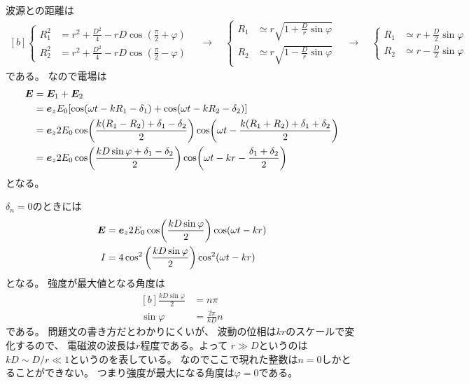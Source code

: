 \documentclass[../../sp_2017.tex]{subfiles}
\begin{document}
\subsection{}
波源との距離は
\begin{equation}\begin{aligned}[b]
    \begin{cases}
        R_1^2 &= r^2 +\frac{D^2}{4}-rD\cos(\frac{\pi}{2}+\varphi)\\
        R_2^2 &= r^2 +\frac{D^2}{4}-rD\cos(\frac{\pi}{2}-\varphi)
    \end{cases} \quad\to\quad
    \begin{cases}
        R_1 &\simeq r \sqrt{1+\frac{D}{r}\sin\varphi}\\
        R_2 &\simeq r \sqrt{1-\frac{D}{r}\sin\varphi}
    \end{cases}\quad\to\quad
    \begin{cases}
        R_1 &\simeq r + \frac{D}{2}\sin\varphi\\
        R_2 &\simeq r - \frac{D}{2}\sin\varphi
    \end{cases}
\end{aligned}\end{equation}
である。
なので電場は
\begin{equation}\begin{aligned}[b]
    \vb*{E} &= \vb*{E}_1+\vb*{E}_2\\
    &= \vb*{e}_zE_0\qty[\cos(\omega t-kR_1-\delta_1)+\cos(\omega t-kR_2-\delta_2)]\\
    &= \vb*{e}_z 2E_0\cos(\frac{k(R_1-R_2)+\delta_1-\delta_2}{2})\cos(\omega t-\frac{k(R_1+R_2)+\delta_1+\delta_2}{2})\\
    &= \vb*{e}_z 2E_0\cos(\frac{kD\sin\varphi+\delta_1-\delta_2}{2})\cos(\omega t-kr-\frac{\delta_1+\delta_2}{2})\\
\end{aligned}\end{equation}
となる。

\(\delta_n=0\)のときには
\begin{equation}\begin{aligned}[b]
    \vb*{E} &=  \vb*{e}_z 2E_0\cos(\frac{kD\sin\varphi}{2})\cos(\omega t-kr)\\
    I &= 4\cos^2\qty(\frac{kD\sin\varphi}{2})\cos^2(\omega t-kr)
\end{aligned}\end{equation}
となる。
強度が最大値となる角度は
\begin{equation}\begin{aligned}[b]
    \frac{kD\sin\varphi}{2} &= n\pi\\
    \sin\varphi &= \frac{2\pi}{kD}n
\end{aligned}\end{equation}
である。
問題文の書き方だとわかりにくいが、
波動の位相は\(kr\)のスケールで変化するので、
電磁波の波長は\(r\)程度である。よって
\(r\gg D\)というのは\(kD\sim D/r \ll 1\)というのを表している。
なのでここで現れた整数は\(n=0\)しかとることができない。
つまり強度が最大になる角度は\(\varphi=0\)である。
\end{document}
